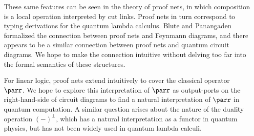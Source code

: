 \documentclass{article}
\begin{document}
These same features can be seen in the theory of proof nets, in which composition
is a local operation interpreted by cut links. Proof nets in turn correspond
to typing derivations for the quantum lambda calculus. Blute and
Panangaden~\cite{blute2011proof} formalized the connection between
proof nets and Feynmann diagrams, and there appears to be a similar connection
between proof nets and quantum circuit diagrams.
We hope to make the connection intuitive without delving too far into the formal semantics
of these structures.

For linear logic, proof nets extend intuitively to cover the classical operator $\parr$.
We hope to explore this interpretation of $\parr$ as output-ports on the right-hand-side 
of circuit diagrams to find a natural interpretation of $\parr$ in quantum computation.
A similar question arises about the nature of the duality operation $(-)^\bot$,
which has a natural interpretation as a functor in quantum physics, but has not been
widely used in quantum lambda calculi.




\end{document}
